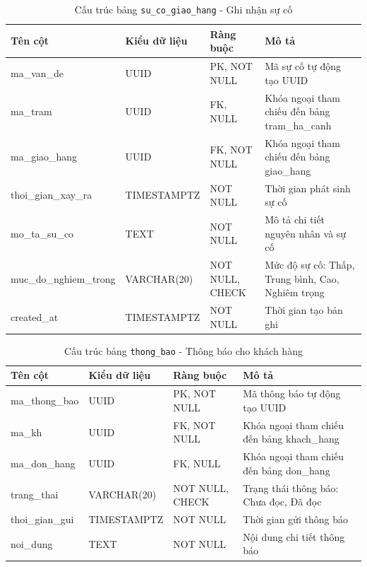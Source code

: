 \begin{table}[H]
  \centering
  \begin{tabularx}{\textwidth}{|l|l|l|>{\raggedright\arraybackslash}X|}
    \hline
    \textbf{Tên cột} & \textbf{Kiểu dữ liệu} & \textbf{Ràng buộc} & \textbf{Mô tả} \\
    \hline
    ma\_van\_de          & UUID            & PK, NOT NULL    & Mã sự cố tự động tạo UUID \\ \hline
    ma\_tram             & UUID            & FK, NULL        & Khóa ngoại tham chiếu đến bảng tram\_ha\_canh \\ \hline
    ma\_giao\_hang       & UUID            & FK, NOT NULL    & Khóa ngoại tham chiếu đến bảng giao\_hang \\ \hline
    thoi\_gian\_xay\_ra  & TIMESTAMPTZ     & NOT NULL        & Thời gian phát sinh sự cố \\ \hline
    mo\_ta\_su\_co       & TEXT            & NOT NULL        & Mô tả chi tiết nguyên nhân và sự cố \\ \hline
    muc\_do\_nghiem\_trong & VARCHAR(20)     & NOT NULL, CHECK & Mức độ sự cố: Thấp, Trung bình, Cao, Nghiêm trọng \\ \hline
    created\_at          & TIMESTAMPTZ     & NOT NULL        & Thời gian tạo bản ghi \\
    \hline
  \end{tabularx}
  \caption{Cấu trúc bảng \texttt{su\_co\_giao\_hang} - Ghi nhận sự cố}
  \label{tab:db-su-co-giao-hang}
\end{table}

\begin{table}[H]
  \centering
  \begin{tabularx}{\textwidth}{|l|l|l|>{\raggedright\arraybackslash}X|}
    \hline
    \textbf{Tên cột} & \textbf{Kiểu dữ liệu} & \textbf{Ràng buộc} & \textbf{Mô tả} \\
    \hline
    ma\_thong\_bao       & UUID            & PK, NOT NULL    & Mã thông báo tự động tạo UUID \\ \hline
    ma\_kh               & UUID            & FK, NOT NULL    & Khóa ngoại tham chiếu đến bảng khach\_hang \\ \hline
    ma\_don\_hang        & UUID            & FK, NULL        & Khóa ngoại tham chiếu đến bảng don\_hang \\ \hline
    trang\_thai          & VARCHAR(20)     & NOT NULL, CHECK & Trạng thái thông báo: Chưa đọc, Đã đọc \\ \hline
    thoi\_gian\_gui      & TIMESTAMPTZ     & NOT NULL        & Thời gian gửi thông báo \\ \hline
    noi\_dung            & TEXT            & NOT NULL        & Nội dung chi tiết thông báo \\
    \hline
  \end{tabularx}
  \caption{Cấu trúc bảng \texttt{thong\_bao} - Thông báo cho khách hàng}
  \label{tab:db-thong-bao}
\end{table}

